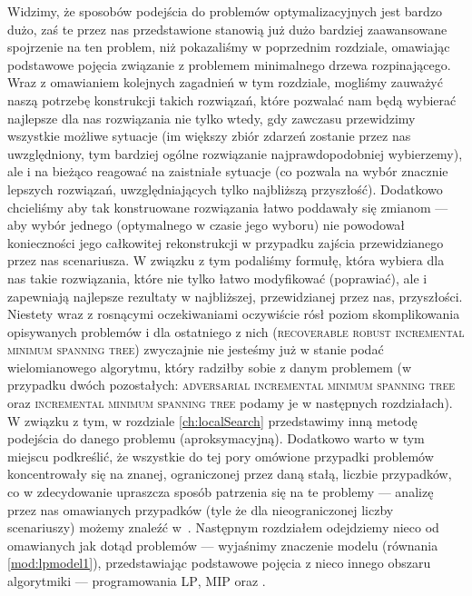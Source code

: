 Widzimy, że sposobów podejścia do problemów optymalizacyjnych jest bardzo dużo, zaś te przez nas przedstawione stanowią już dużo bardziej zaawansowane spojrzenie na ten problem, niż pokazaliśmy w poprzednim rozdziale, omawiając podstawowe pojęcia związanie z problemem minimalnego drzewa rozpinającego. Wraz z omawianiem kolejnych zagadnień w tym rozdziale, mogliśmy zauważyć naszą potrzebę konstrukcji takich rozwiązań, które pozwalać nam będą wybierać najlepsze dla nas rozwiązania nie tylko wtedy, gdy zawczasu przewidzimy wszystkie możliwe sytuacje (im większy zbiór zdarzeń zostanie przez nas uwzględniony, tym bardziej ogólne rozwiązanie najprawdopodobniej wybierzemy), ale i na bieżąco reagować na zaistniałe sytuacje (co pozwala na wybór znacznie lepszych rozwiązań, uwzględniających tylko najbliższą przyszłość). Dodatkowo chcieliśmy aby tak konstruowane rozwiązania łatwo poddawały się zmianom --- aby wybór jednego (optymalnego w czasie jego wyboru) nie powodował konieczności jego całkowitej rekonstrukcji w przypadku zajścia przewidzianego przez nas scenariusza. W związku z tym podaliśmy formułę, która wybiera dla nas takie rozwiązania, które nie tylko łatwo modyfikować (poprawiać), ale i zapewniają najlepsze rezultaty w najbliższej, przewidzianej przez nas, przyszłości. Niestety wraz z rosnącymi oczekiwaniami oczywiście rósł poziom skomplikowania opisywanych problemów i dla ostatniego z nich (\textsc{recoverable robust incremental minimum spanning tree}) zwyczajnie nie jesteśmy już w stanie podać wielomianowego algorytmu, który radziłby sobie z danym problemem (w przypadku dwóch pozostałych: \textsc{adversarial incremental minimum spanning tree} oraz \textsc{incremental minimum spanning tree} podamy je w następnych rozdziałach). W związku z tym, w rozdziale \ref{ch:localSearch} przedstawimy inną metodę podejścia do danego problemu (aproksymacyjną). Dodatkowo warto w tym miejscu podkreślić, że wszystkie do tej pory omówione przypadki problemów koncentrowały się na znanej, ograniczonej przez daną stałą, liczbie przypadków, co w zdecydowanie upraszcza sposób patrzenia się na te problemy --- analizę przez nas omawianych przypadków (tyle że dla nieograniczonej liczby scenariuszy) możemy znaleźć w~\cite{DBLP:journals/corr/abs-0804-0396}. Następnym rozdziałem odejdziemy nieco od omawianych jak dotąd problemów --- wyjaśnimy znaczenie modelu (równania \ref{mod:lpmodel1}), przedstawiając podstawowe pojęcia z nieco innego obszaru algorytmiki --- programowania \textsc{LP}, \textsc{MIP} oraz .